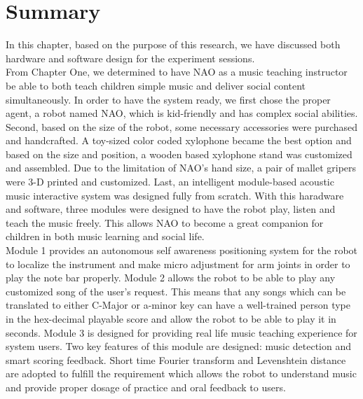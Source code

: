 \section{Summary}
In this chapter, based on the purpose of this research, we have discussed both hardware
and software design for the experiment sessions.\\

From Chapter One, we determined to have NAO as a music teaching instructor be able
to both teach children simple music and deliver social content simultaneously.
In order to have the system ready, we first chose the proper agent, a robot named NAO, which is
kid-friendly and has complex social abilities. Second, based on the size of the robot, some necessary
accessories were purchased and handcrafted. A toy-sized color coded xylophone became the
best option and based on the size and position, a wooden based xylophone stand was 
customized and assembled. Due to the limitation of NAO's hand size, a pair of mallet gripers 
were 3-D printed and customized. Last, an intelligent module-based acoustic music 
interactive system was designed fully from scratch. With this haradware and software, 
three modules were designed to have the robot play, listen and teach the music freely. This allows
NAO to become a great companion for children in both music learning and social life. \\

Module 1 provides an autonomous self awareness positioning system for the robot to localize
the instrument and make micro adjustment for arm joints in order to play the note bar properly.
Module 2 allows the robot to be able to play any customized song of the user's request. This
means that any songs which can be translated to either C-Major or a-minor key can have a well-trained
person type in the hex-decimal playable score and allow the robot to be able to play it in seconds. Module 3
is designed for providing real life music teaching experience for system users. Two key features
of this module are designed: music detection and smart scoring feedback. Short time Fourier transform
and Levenshtein distance are adopted to fulfill the requirement which allows the robot to understand
music and provide proper dosage of practice and oral feedback to users.\\


